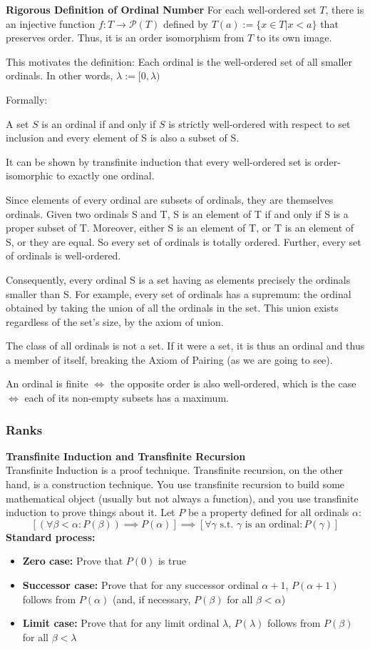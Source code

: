 \documentclass{article}
\newcommand{\0}{{\bf{0}}}
\begin{document}
\textbf{Rigorous Definition of Ordinal Number}
For each well-ordered set $T$, there is an injective function $f:T \to \mathcal{P}(T)$ defined by $T(a):=\{x \in T | x < a\}$ that preserves order. Thus, it is an order isomorphism from $T$ to its own image.

This motivates the definition: Each ordinal is the well-ordered set of all smaller ordinals. In other words, $\lambda := [0,\lambda)$

Formally:

A set $S$ is an ordinal if and only if $S$ is strictly well-ordered with respect to set inclusion and every element of S is also a subset of S.

It can be shown by transfinite induction that every well-ordered set is order-isomorphic to exactly one ordinal.

Since elements of every ordinal are subsets of ordinals, they are themselves ordinals. Given two ordinals S and T, S is an element of T if and only if S is a proper subset of T. Moreover, either S is an element of T, or T is an element of S, or they are equal. So every set of ordinals is totally ordered. Further, every set of ordinals is well-ordered.

Consequently, every ordinal S is a set having as elements precisely the ordinals smaller than S. For example, every set of ordinals has a supremum: the ordinal obtained by taking the union of all the ordinals in the set. This union exists regardless of the set's size, by the axiom of union.

The class of all ordinals is not a set. If it were a set, it is thus an ordinal and thus a member of itself, breaking the Axiom of Pairing (as we are going to see).

An ordinal is finite $\iff$ the opposite order is also well-ordered, which is the case $\iff$ each of its non-empty subsets has a maximum.
$$$$

\subsubsection{Ranks}
\textbf{Transfinite Induction and Transfinite Recursion}\\
Transfinite Induction is a proof technique. Transfinite recursion, on the other hand, is a construction technique. You use transfinite recursion to build some mathematical object (usually but not always a function), and you use transfinite induction to prove things about it.
Let $P$ be a property defined for all ordinals $\alpha$:
$$[(\forall\beta<\alpha:P(\beta ))\implies P(\alpha)]\implies[\forall\gamma\mbox{ s.t. }\gamma\mbox{ is an ordinal}:P(\gamma)]$$
\textbf{Standard process:}
\begin{itemize}
    \item \textbf{Zero case:} Prove that $P(0)$ is true
    \item \textbf{Successor case:} Prove that for any successor ordinal $\alpha+1$, $P(\alpha+1)$ follows from $P(\alpha)$ (and, if necessary, $P(\beta )$ for all $\beta <\alpha$)
    \item \textbf{Limit case:} Prove that for any limit ordinal $\lambda$, $P(\lambda)$ follows from $P(\beta)$ for all $\beta<\lambda$
\end{itemize}
\end{document}
